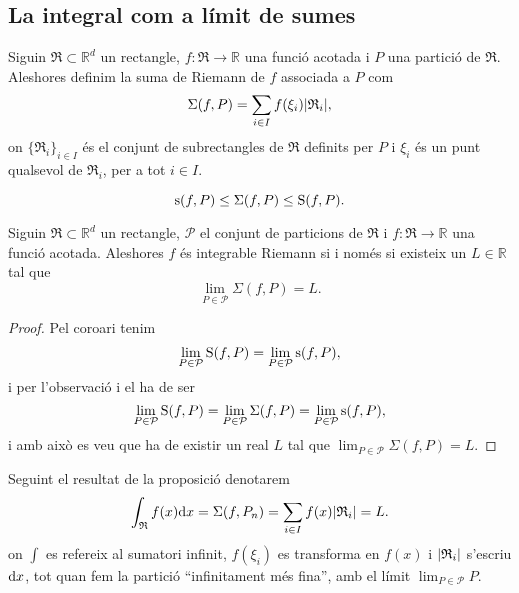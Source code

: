 \documentclass[../Apunts.tex]{subfiles}
\begin{document}
	\subsection{La integral com a límit de sumes}
	\begin{definition}
		\label{def:Suma de Riemann}
		Siguin \(\mathfrak{R}\subset\mathbb{R}^{d}\) un rectangle, \(f\colon\mathfrak{R}\to\mathbb{R}\) una funció acotada i \(P\) una partició de \(\mathfrak{R}\). Aleshores definim la suma de Riemann de \(f\) associada a \(P\) com
		\[\Sigma(f,P)=\sum_{i\in I}f(\xi_{i})\abs{\mathfrak{R}_{i}},\]
		on \(\{\mathfrak{R}_{i}\}_{i\in I}\) és el conjunt de subrectangles de \(\mathfrak{R}\) definits per \(P\) i \(\xi_{i}\) és un punt qualsevol de \(\mathfrak{R}_{i}\), per a tot \(i\in I\).
	\end{definition}
	\begin{observation}
		\label{obs:Sumes inferior i superior i suma de riemann}
		\[\operatorname{s}(f,P)\leq\Sigma(f,P)\leq\operatorname{S}(f,P).\]
	\end{observation}
	\begin{proposition}
		\label{prop:Integrable Riemann iff existeix la suma}
		Siguin \(\mathfrak{R}\subset\mathbb{R}^{d}\) un rectangle, \(\mathcal{P}\) el conjunt de particions de \(\mathfrak{R}\) i \(f\colon\mathfrak{R}\to\mathbb{R}\) una funció acotada. Aleshores \(f\) és integrable Riemann si i només si existeix un \(L\in\mathbb{R}\) tal que
		\[\lim_{P\in\mathcal{P}}\Sigma(f,P)=L.\]
		\begin{proof}
			Pel coro{\lgem}ari  tenim
			\[\lim_{P\in\mathcal{P}}\operatorname{S}(f,P)=\lim_{P\in\mathcal{P}}\operatorname{s}(f,P),\]
			i per l'observació  i el  ha de ser
			\[\lim_{P\in\mathcal{P}}\operatorname{S}(f,P)=\lim_{P\in\mathcal{P}}\Sigma(f,P)=\lim_{P\in\mathcal{P}}\operatorname{s}(f,P),\]
			i amb això es veu que ha de existir un real \(L\) tal que \(\lim_{P\in\mathcal{P}}\Sigma(f,P)=L\).
		\end{proof}
	\end{proposition}
	\begin{notation}
		Seguint el resultat de la proposició  denotarem
		\[\int_{\mathfrak{R}}f(x)\diff x=\Sigma(f,P_{n})=\sum_{i\in I}f(x)\abs{\mathfrak{R}_{i}}=L.\]
		on \(\int\) es refereix al sumatori infinit, \(f(\xi_{i})\) es transforma en \(f(x)\) i \(\abs{\mathfrak{R}_{i}}\) s'escriu \(\textrm{d} x\), tot quan fem la partició ``infinitament més fina'', amb el límit \(\lim_{P\in\mathcal{P}}P\).%
	\end{notation}
\end{document}
